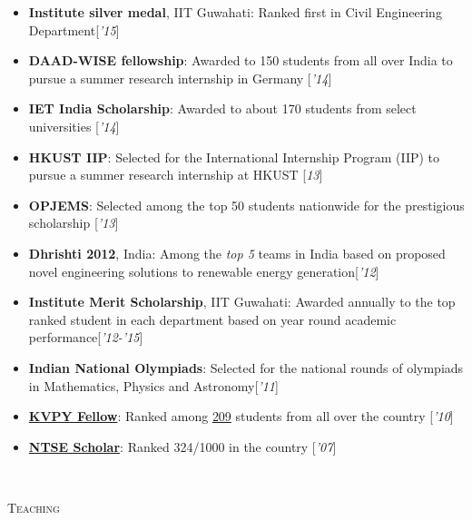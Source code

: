 \documentclass[10pt]{article}
\begin{document}
\begin{minipage}[t]{0.85\linewidth}
	\vspace{-1em}
	\begin{itemize}[itemsep=-1pt]
		\item {\bf Institute silver medal}, IIT Guwahati: Ranked first in Civil Engineering Department\hfill [\textsl{'15}]
		\item {\bf DAAD-WISE fellowship}: Awarded to 150 students from all over India to pursue a summer research internship in Germany \hfill [\textsl{'14}]
		\item {\bf IET India Scholarship}: Awarded to about 170 students from select universities \hfill [\textsl{'14}]
		\item {\bf HKUST IIP}: Selected for the International Internship Program (IIP) to pursue a summer research internship at HKUST \hfill [\textsl{13}]
		\item {\bf OPJEMS}: Selected among the top 50 students nationwide for the prestigious scholarship \hfill [\textsl{'13}]
		\item {\bf Dhrishti 2012}, India: Among the \textsl{top 5} teams in India based on proposed novel engineering solutions to renewable energy generation\hfill [\textsl{'12}]
		\item {\bf Institute Merit Scholarship}, IIT Guwahati: Awarded annually to the top ranked student in each department based on year round academic performance\hfill [\textsl{'12-'15}]
		\item {\bf Indian National Olympiads}: Selected for the national rounds of olympiads in Mathematics, Physics and Astronomy\hfill [\textsl{'11}]
		\item {\bf \href{http://www.kvpy.iisc.ernet.in/main/index.htm}{KVPY Fellow}}: Ranked among \href{http://www.kvpy.iisc.ernet.in/main/fellows.htm#2009}{209} students from all over the country \hfill[\textsl{'10}]
		\item {\href{http://www.ncert.nic.in/programmes/talent_exam/index_talent.html}{\bf NTSE Scholar}}: Ranked 324/1000 in the country \hfill [\textsl{'07}]
	\end{itemize}
\end{minipage}\\[3mm]
\begin{minipage}{0.15\linewidth}
	\textsc{Teaching}
\end{minipage}\hfill
\end{document}
